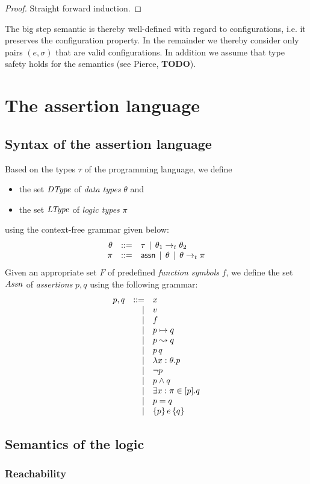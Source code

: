 \documentclass[12pt,a4paper]{report}
\begin{document}
\begin{proof}
  Straight forward induction.
\end{proof}

The big step semantic is thereby well-defined with regard to configurations, i.e. it preserves
the configuration property. In the remainder
we thereby consider only pairs $(e,\sigma)$ that are valid configurations. In addition we
assume that type safety holds for the semantics (see Pierce, {\bf TODO}).



\chapter{The assertion language}



\section{Syntax of the assertion language}

Based on the types $\tau$ of the programming language, we define
\begin{itemize}
  \item the set $\mathit{DType}$ of {\em data types} $\theta$ and
  \item the set $\mathit{LType}$ of {\em logic types} $\pi$
\end{itemize}
using the context-free grammar given below:
\[\begin{array}{rrlll}
  \theta & ::= & \tau \,\mid\, \theta_1\rightarrow_t\theta_2 \\
  \pi & ::= & \mathsf{assn} \,\mid\, \theta \,\mid\, \theta\rightarrow_t\pi
\end{array}\]
Given an appropriate set $F$ of predefined {\em function symbols} $f$, we
define the set $\mathit{Assn}$ of {\em assertions} $p,q$ using the following grammar:
\[\begin{array}{rrlll}
  p,q & ::= & x
      \\ & \mid & v
      \\ & \mid & f
      \\ & \mid & p \mapsto q
      \\ & \mid & p \leadsto q
      \\ & \mid & p\,q
      \\ & \mid & \lambda x:\theta.p
      \\ & \mid & \neg p
      \\ & \mid & p \wedge q
      \\ & \mid & \exists x:\pi \in [p]. q
      \\ & \mid & p = q
      \\ & \mid & \{p\}\,e\,\{q\}
\end{array}\]



\section{Semantics of the logic}



\subsection{Reachability}
\end{document}
